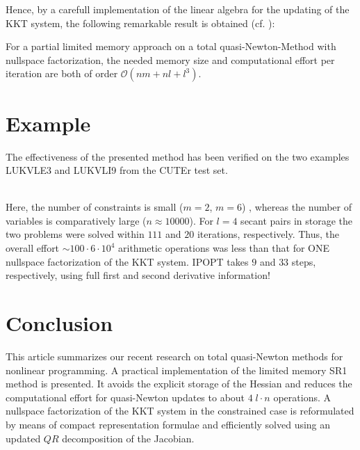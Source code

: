 \documentclass{svmult}
\begin{document}
\noindent Hence, by a carefull implementation of the linear algebra for the updating of the KKT system, the following remarkable result is obtained (cf. \cite{tb:TORSTEN}):

\begin{theorem} 
For a partial limited memory approach on a total quasi-Newton-Method with nullspace factorization, the needed memory size and computational effort per iteration
are both of order $\mathcal{O}(nm+nl+l^3)$.
\end{theorem}

\section{Example}
The effectiveness of the presented method has been verified on the two examples LUKVLE3 and LUKVLI9 from the CUTEr test set.\\
\begin{minipage}[b]{0.49\linewidth}
\end{minipage}
\begin{minipage}[b]{0.49\linewidth}
\end{minipage}\\
Here, the number of constraints is small ($m=2$,  $m=6$) , whereas the number of variables is comparatively large ($n\approx 10 000$).
For $l=4$ secant pairs in storage the two problems were solved within $111$ and $20$ iterations, respectively.
Thus, the overall effort $\sim 100\cdot6\cdot 10^4$ arithmetic operations was less than that for ONE nullspace factorization of the KKT system. IPOPT takes $9$ and $33$ steps, respectively, using full first and second derivative information!

\section{Conclusion}
\noindent 
This article summarizes our recent research on total quasi-Newton methods for
nonlinear programming. A practical implementation of the limited memory SR1 method is
presented. It avoids the explicit storage of the Hessian and reduces the
computational effort for quasi-Newton updates to about $4 \; l\cdot n$ operations. A
nullspace factorization of the KKT system in the constrained case is reformulated by
means of compact representation formulae and efficiently solved using an updated $QR$
decomposition of the Jacobian.
\end{document}
